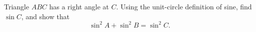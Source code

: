 Triangle $ABC$ has a right angle at $C$. Using the unit-circle definition of sine, find $\sin C$, and show that
\[
\sin^2A+\sin^2B=\sin^2C .
\]
